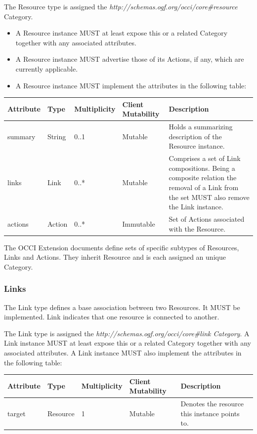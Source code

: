 \documentclass[10pt,a4paper]{article}
\begin{document}
The Resource type is assigned the \textit{http://schemas.ogf.org/occi/core\#resource} Category.

\begin{itemize}
  \item A Resource instance MUST at least expose this or a related Category together with any associated attributes.
  \item A Resource instance MUST advertise those of its Actions, if any, which are currently applicable.
  \item A Resource instance MUST implement the attributes in the following table:
\end{itemize}

\begin{tabular}{l|l|l|l|p{2.7in}}
Attribute & Type & Multiplicity & Client Mutability & Description \\
\hline
summary & String & 0..1 & Mutable & Holds a summarizing description of the Resource instance.\\
links & Link & 0..* & Mutable & Comprises a set of Link compositions. Being a composite relation the removal of a Link from the set MUST also remove the Link instance.\\
actions & Action & 0..* & Immutable & Set of Actions associated with the Resource.\\
\end{tabular}

The OCCI Extension documents define sets of specific subtypes of Resources, Links and Actions. They inherit Resource and is each assigned an unique Category.

\subsubsection{Links}
The Link type defines a base association between two Resources. It MUST be implemented. Link indicates that one resource is connected to another.

The Link type is assigned the \textit{http://schemas.ogf.org/occi/core\#link Category}. A Link instance MUST at least expose this or a related Category together with any associated attributes. A Link instance MUST also implement the attributes in the following table:

\begin{tabular}{l|l|l|l|p{2.7in}}
Attribute & Type & Multiplicity & Client Mutability & Description \\
\hline
target & Resource & 1 & Mutable & Denotes the resource this instance points to.\\
\end{tabular}
\end{document}
